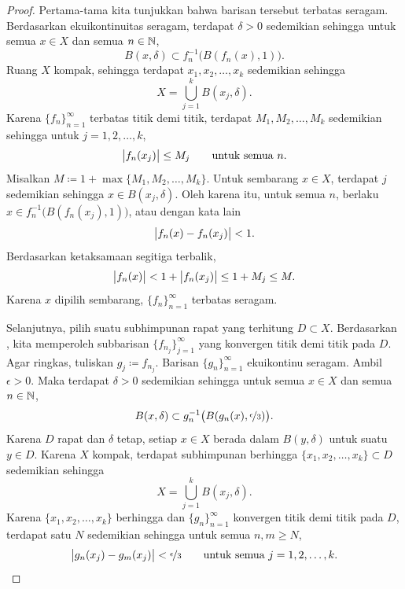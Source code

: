 \begin{proof}
Pertama-tama kita tunjukkan bahwa barisan tersebut terbatas seragam.
Berdasarkan ekuikontinuitas seragam,
terdapat $\delta > 0$
sedemikian sehingga
untuk semua $x \in X$ dan semua $n \in {\mathbb{N}}$,
\begin{equation*}
B(x,\delta) \subset f_n^{-1}\bigl(B(f_n(x),1)\bigr) .
\end{equation*}
Ruang $X$ kompak, sehingga terdapat $x_1,x_2,\ldots,x_k$
sedemikian sehingga
\begin{equation*}
X = \bigcup_{j=1}^k B(x_j,\delta) .
\end{equation*}
Karena $\{ f_n \}_{n=1}^\infty$ terbatas titik demi titik, terdapat $M_1,M_2,\ldots,M_k$
sedemikian sehingga untuk $j=1,2,\ldots,k$,
\begin{equation*}
\bigl\lvert {f_n(x_j)} \bigr\rvert \leq M_j \qquad \text{untuk semua } n.
\end{equation*}
Misalkan $M \coloneqq 1+ \max \{ M_1,M_2,\ldots,M_k \}$.  Untuk sembarang
$x \in X$, terdapat $j$ sedemikian sehingga $x \in B(x_j,\delta)$.  Oleh karena itu,
untuk semua $n$, berlaku
$x \in f_n^{-1}\bigl(B(f_n(x_j),1)\bigr)$, atau dengan kata lain
\begin{equation*}
\bigl\lvert {f_n(x)-f_n(x_j)} \bigr\rvert < 1 .
\end{equation*}
Berdasarkan ketaksamaan segitiga terbalik,
\begin{equation*}
\bigl\lvert {f_n(x)} \bigr\rvert < 1+ \bigl\lvert {f_n(x_j)} \bigr\rvert \leq 1+M_j \leq M .
\end{equation*}
Karena $x$ dipilih sembarang, $\{f_n\}_{n=1}^\infty$ terbatas seragam.


Selanjutnya, pilih suatu subhimpunan rapat yang terhitung $D \subset X$.
Berdasarkan , kita memperoleh
subbarisan $\{ f_{n_j} \}_{j=1}^\infty$ yang konvergen titik demi titik pada $D$.
Agar ringkas, tuliskan $g_j \coloneqq f_{n_j}$.
Barisan $\{ g_n \}_{n=1}^\infty$
ekuikontinu seragam.
Ambil $\epsilon > 0$.  Maka terdapat $\delta > 0$
sedemikian sehingga untuk semua $x \in X$ dan semua $n \in {\mathbb{N}}$,
\begin{equation*}
B(x,\delta) \subset g_n^{-1}\bigl(B(g_n(x),\nicefrac{\epsilon}{3})\bigr).
\end{equation*}
Karena $D$ rapat dan $\delta$ tetap, setiap $x \in X$ berada dalam $B(y,\delta)$
untuk suatu $y \in D$.  Karena $X$ kompak,
terdapat subhimpunan berhingga $\{ x_1,x_2,\ldots,x_k \} \subset D$
sedemikian sehingga
\begin{equation*}
X = \bigcup_{j=1}^k B(x_j,\delta) .
\end{equation*}
Karena $\{ x_1,x_2,\ldots,x_k \}$
berhingga dan $\{ g_n \}_{n=1}^\infty$
konvergen titik demi titik pada $D$, terdapat satu $N$ sedemikian sehingga untuk
semua $n,m \geq N$,
\begin{equation*}
\bigl\lvert {g_n(x_j)-g_m(x_j)} \bigr\rvert < \nicefrac{\epsilon}{3}
 \qquad \text{untuk semua } j=1,2,\ldots,k.
\end{equation*}


\end{proof}

